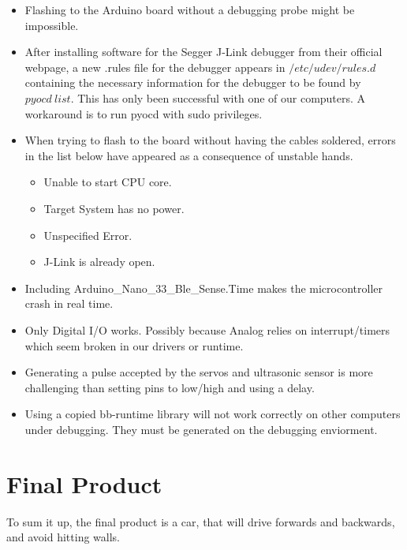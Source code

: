 \documentclass{article}
\begin{document}
\begin{itemize}
	\item Flashing to the Arduino board without a debugging probe might be impossible.

	\item After installing software for the Segger J-Link debugger from their official webpage, a new .rules file for the debugger appears in $/etc/udev/rules.d$ containing the necessary information for the debugger to be found by $pyocd\ list$. This has only been successful with one of our computers. A workaround is to run pyocd with sudo privileges.

	\item When trying to flash to the board without having the cables soldered, errors in the list below have appeared as a consequence of unstable hands.
		\begin{itemize}
			\item Unable to start CPU core.
			\item Target System has no power.
            \item Unspecified Error.
            \item J-Link is already open.
		\end{itemize}

	\item Including Arduino\_Nano\_33\_Ble\_Sense.Time makes the microcontroller crash in real time.

	\item Only Digital I/O works. Possibly because Analog relies on interrupt/timers which seem broken in our drivers or runtime.

	\item Generating a pulse accepted by the servos and ultrasonic sensor is more challenging than setting pins to low/high and using a delay.

	\item Using a copied bb-runtime library will not work correctly on other computers under debugging. They must be generated on the debugging enviorment.

\end{itemize}

\section{Final Product}
To sum it up, the final product is a car, that will drive forwards and backwards, and avoid hitting walls. 
\end{document}
